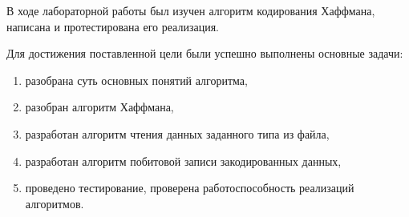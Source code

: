 
В ходе лабораторной работы был изучен алгоритм кодирования Хаффмана, написана и протестирована его реализация.

Для достижения поставленной цели были успешно выполнены основные задачи: 
\begin{enumerate}
	\item разобрана суть основных понятий алгоритма,
	\item разобран алгоритм Хаффмана,
	\item разработан алгоритм чтения данных заданного типа из файла,
	\item разработан алгоритм побитовой записи закодированных данных,
	\item проведено тестирование, проверена работоспособность реализаций алгоритмов.
\end{enumerate}
